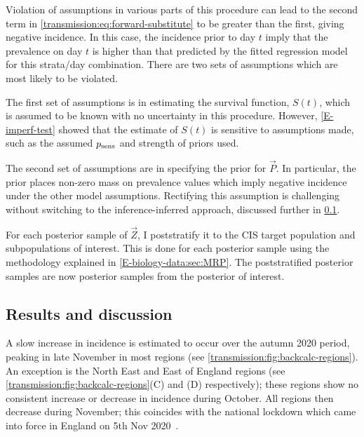 \documentclass[thesis.tex]{subfiles}
\begin{document}
Violation of assumptions in various parts of this procedure can lead to the second term in \cref{transmission:eq:forward-substitute} to be greater than the first, giving negative incidence.
In this case, the incidence prior to day $t$ imply that the prevalence on day $t$ is higher than that predicted by the fitted regression model for this strata/day combination.
There are two sets of assumptions which are most likely to be violated.

The first set of assumptions is in estimating the survival function, $S(t)$, which is assumed to be known with no uncertainty in this procedure.
However, \cref{E-imperf-test} showed that the estimate of $S(t)$ is sensitive to assumptions made, such as the assumed $p_\text{sens}$ and strength of priors used.

The second set of assumptions are in specifying the prior for $\vec{P}$.
In particular, the prior places non-zero mass on prevalence values which imply negative incidence under the other model assumptions.
Rectifying this assumption is challenging without switching to the inference-inferred approach, discussed further in \cref{backcalc:sec:results}.

For each posterior sample of $\vec{Z}$, I poststratify it to the CIS target population and subpopulations of interest.
This is done for each posterior sample using the methodology explained in \cref{E-biology-data:sec:MRP}.
The poststratified posterior samples are now posterior samples from the posterior of interest.


\subsection{Results and discussion} \label{backcalc:sec:results}

A slow increase in incidence is estimated to occur over the autumn 2020 period, peaking in late November in most regions (see \cref{transmission:fig:backcalc-regions}).
An exception is the North East and East of England regions (see \cref{transmission:fig:backcalc-regions}(C) and (D) respectively); these regions show no consistent increase or decrease in incidence during October.
All regions then decrease during November; this coincides with the national lockdown which came into force in England on 5th Nov 2020~\autocite{ifgTimeline}.
\end{document}
